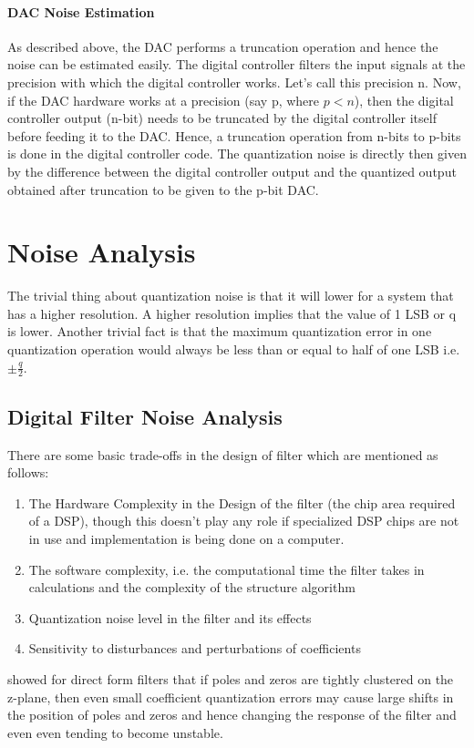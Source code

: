 \documentclass[colorlinks=true,pdfstartview=FitV,linkcolor=blue,
            citecolor=red,urlcolor=magenta]{ligodoc}
\begin{document}
   \paragraph{DAC Noise Estimation}
	As described above, the DAC performs a truncation operation and hence the noise can be estimated easily. The digital controller filters the input signals at the precision with which the digital controller works. Let's call this precision n. Now, if the DAC hardware works at a precision (say p, where $p<n$), then the digital controller output (n-bit) needs to be truncated by the digital controller itself before feeding it to the DAC. Hence, a truncation operation from n-bits to p-bits is done in the digital controller code. The quantization noise is directly then given by the difference between the digital controller output and the quantized output obtained after truncation to be given to the p-bit DAC.
\section{Noise Analysis}
The trivial thing about quantization noise is that it will lower for a system that has a higher resolution. A higher resolution implies that the value of 1 LSB  or q is lower. Another trivial fact is that the maximum quantization error in one quantization operation would always be less than or equal to half of one LSB i.e. $\pm\frac{q}{2}$. \\

	\subsection{Digital Filter Noise Analysis}
    There are some basic trade-offs in the design of filter which are mentioned as follows: \\
		\begin{enumerate}
		\item The Hardware Complexity in the Design of the filter (the chip area required of a DSP), though this doesn't play any role if specialized DSP chips are not in use and implementation is being done on a computer. 
		\item The software complexity, i.e. the computational time the filter takes in calculations and the complexity of the structure algorithm 
		\item Quantization noise level in the filter and its effects 
		\item Sensitivity to disturbances and perturbations of coefficients 
		\end{enumerate}
\cite{Kaiser} showed for direct form filters that if poles and zeros are tightly clustered on the z-plane, then even small coefficient quantization errors may cause large shifts in the position of poles and zeros and hence changing the response of the filter and even even tending to become unstable.  \\
\end{document}
